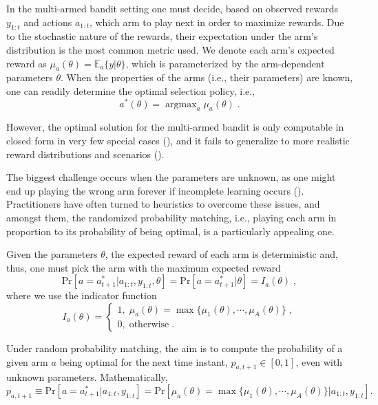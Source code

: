 \documentclass[10pt]{article}
\newcommand{\ie}{i.e., }
\newcommand{\argmax}{\mathop{\mathrm{argmax}}}
\begin{document}
In the multi-armed bandit setting one must decide, based on observed rewards $y_{1:t}$ and actions $a_{1:t}$, which arm to play next in order to maximize rewards. Due to the stochastic nature of the rewards, their expectation under the arm's distribution is the most common metric used. We denote each arm's expected reward as $\mu_{a}(\theta)=\mathbb{E}_{a}\{y|\theta\}$, which is parameterized by the arm-dependent parameters $\theta$. When the properties of the arms (\ie their parameters) are known, one can readily determine the optimal selection policy, \ie
		\begin{equation}
		a^*(\theta)=\argmax_{a}\mu_{a}(\theta) \; .
		\end{equation}
		
However, the optimal solution for the multi-armed bandit is only computable in closed form in very few special cases (\cite{j-Bellm1956, j-Gittins1979}), and it fails to generalize to more realistic reward distributions and scenarios (\cite{j-Scott2010}).

The biggest challenge occurs when the parameters are unknown, as one might end up playing the wrong arm forever if incomplete learning occurs (\cite{j-Brezzi2000}). Practitioners have often turned to heuristics to overcome these issues, and amongst them, the randomized probability matching, \ie playing each arm in proportion to its probability of being optimal, is a particularly appealing one.

Given the parameters $\theta$, the expected reward of each arm is deterministic and, thus, one must pick the arm with the maximum expected reward
\begin{equation}
\mathrm{Pr}\left[a=a_{t+1}^*|a_{1:t}, y_{1:t}, \theta \right] = \mathrm{Pr}\left[a=a_{t+1}^*|\theta \right] = I_a(\theta) \;,
\end{equation}
where we use the indicator function
\begin{equation}
I_a(\theta) = \begin{cases}
1, \; \mu_{a}(\theta)=\max\{\mu_1(\theta), \cdots, \mu_A(\theta)\} \;, \\
0, \; \text{otherwise} \;.
\end{cases}
\label{eq:theta_known_pr_arm_optimal}
\end{equation}

Under random probability matching, the aim is to compute the probability of a given arm $a$ being optimal for the next time instant, $p_{a,t+1}\in [0,1]$, even with unknown parameters. Mathematically,
\begin{equation}
p_{a,t+1} \equiv \mathrm{Pr}\left[a=a_{t+1}^* \big| a_{1:t}, y_{1:t}\right]=\mathrm{Pr}\left[ \mu_{a}(\theta) = \max\{\mu_1(\theta), \cdots, \mu_A(\theta)\} \big| a_{1:t}, y_{1:t}\right].
\label{eq:theta_unknown_pr_arm_optimal}
\end{equation}
\end{document}
